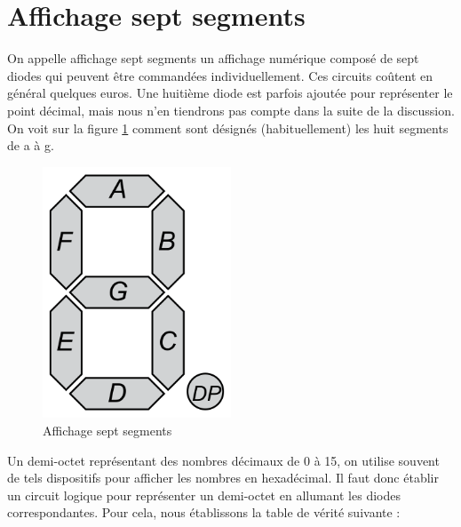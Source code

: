 \documentclass{book}
\theoremstyle{definition}
\theoremstyle{definition}
\begin{document}
\section{Affichage sept segments}
On appelle affichage sept segments un affichage numérique composé de sept diodes qui peuvent être commandées individuellement. Ces circuits coûtent en général quelques euros. Une huitième diode est parfois ajoutée pour représenter le point décimal, mais nous n'en tiendrons pas compte dans la suite de la discussion. On voit sur la figure \ref{fig:7seg} comment sont désignés (habituellement) les huit segments de a à g.

\begin{figure}
\includegraphics[width=0.5\textwidth]{media/SysLogiques/7seg.png}
    \centering
    \caption{Affichage sept segments}
    \label{fig:7seg}
\end{figure}

Un demi-octet représentant des nombres décimaux de 0 à 15, on utilise souvent de tels dispositifs pour afficher les nombres en hexadécimal. Il faut donc établir un circuit logique pour représenter un demi-octet en allumant les diodes correspondantes. Pour cela, nous établissons la table de vérité suivante :
\\
\end{document}
